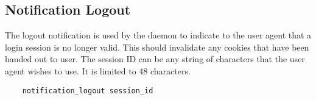 \documentclass[letterpaper,11pt,oneside]{article}
\begin{document}
\subsection{Notification Logout}

The logout notification is used by the daemon to indicate to the user agent
that a login session is no longer valid. This should invalidate any cookies
that have been handed out to user. The session ID can be any string of
characters that the user agent wishes to use. It is limited to 48 characters.

\vspace{10pt}
\begin{verbatim}
    notification_logout session_id
\end{verbatim}
\vspace{10pt}
\end{document}
